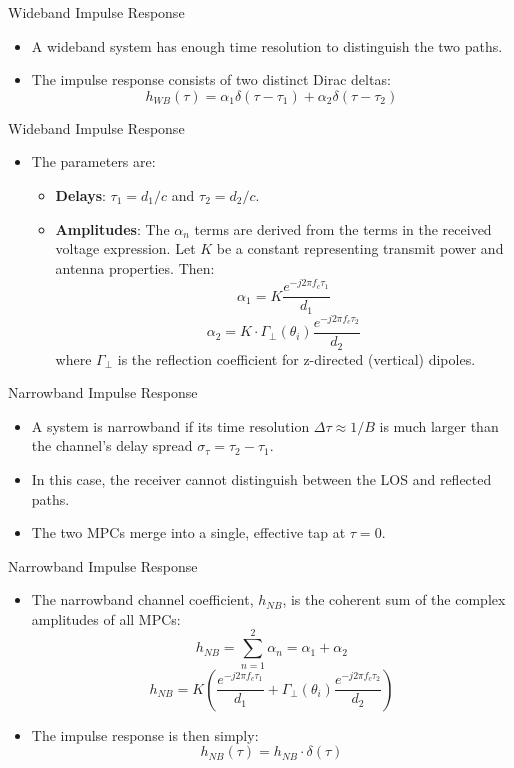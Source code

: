 \documentclass{beamer}
\begin{document}
	\begin{frame}{Wideband Impulse Response}
		\begin{itemize}
			\item A wideband system has enough time resolution to distinguish the two paths.
			\item The impulse response consists of two distinct Dirac deltas:
			\[ h_{WB}(\tau) = \alpha_1 \delta(\tau - \tau_1) + \alpha_2 \delta(\tau - \tau_2) \]
			
		\end{itemize}
	\end{frame}
	
	\begin{frame}{Wideband Impulse Response}
		\begin{itemize}
			\item The parameters are:
			\begin{itemize}
				\item \textbf{Delays}: $\tau_1 = d_1/c$ and $\tau_2 = d_2/c$.
				\item \textbf{Amplitudes}: The $\alpha_n$ terms are derived from the terms in the received voltage expression. Let $K$ be a constant representing transmit power and antenna properties. Then:
				\[ \alpha_1 = K \frac{e^{-j2\pi f_c \tau_1}}{d_1} \]
				\[ \alpha_2 = K \cdot \Gamma_{\perp}(\theta_i) \frac{e^{-j2\pi f_c \tau_2}}{d_2} \]
				where $\Gamma_{\perp}$ is the reflection coefficient for z-directed (vertical) dipoles.
			\end{itemize}
		\end{itemize}
	\end{frame}
	
	
	\begin{frame}{Narrowband Impulse Response}
		\begin{itemize}
			\item A system is narrowband if its time resolution $\Delta\tau \approx 1/B$ is much larger than the channel's delay spread $\sigma_\tau = \tau_2 - \tau_1$.
			\item In this case, the receiver cannot distinguish between the LOS and reflected paths.
			\item The two MPCs merge into a single, effective tap at $\tau=0$.
			
		\end{itemize}
	\end{frame}
	
	\begin{frame}{Narrowband Impulse Response}
		\begin{itemize}
			\item The narrowband channel coefficient, $h_{NB}$, is the coherent sum of the complex amplitudes of all MPCs:
			\[ h_{NB} = \sum_{n=1}^{2} \alpha_n = \alpha_1 + \alpha_2 \]
			\[ h_{NB} = K \left( \frac{e^{-j2\pi f_c \tau_1}}{d_1} + \Gamma_{\perp}(\theta_i) \frac{e^{-j2\pi f_c \tau_2}}{d_2} \right) \]
			\item The impulse response is then simply:
			\[ h_{NB}(\tau) = h_{NB} \cdot \delta(\tau) \]
		\end{itemize}
	\end{frame}
	
\end{document}
